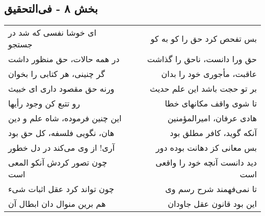 \begin{center}
\section*{بخش ۸ - فی‌التحقیق}
\label{sec:008}
\begin{longtable}{l p{0.5cm} r}
ای خوشا نفسی که شد در جستجو
&&
بس تفحص کرد حق را کو به کو
\\
در همه حالات، حق منظور داشت
&&
حق ورا دانست، ناحق را گذاشت
\\
گر چنینی، هر کتابی را بخوان
&&
عاقبت، مأجوری خود را بدان
\\
ورنه حق مقصود داری ای خبیث
&&
بر تو حجت باشد این علم حدیث
\\
رو تتبع کن وجود رأیها
&&
تا شوی واقف مکانهای خطا
\\
این چنین فرموده، شاه علم و دین
&&
هادی عرفان، امیرالمؤمنین
\\
هان، نگویی فلسفه، کل حق بود
&&
آنکه گوید، کافر مطلق بود
\\
آری! از وی می‌کند در دل خطور
&&
بس معانی کز دهانت بوده دور
\\
چون تصور کردش آنکو المعی است
&&
دید دانست آنچه خود را واقعی است
\\
چون تواند کرد عقل اثبات شیء
&&
تا نمی‌فهمند شرح رسم وی
\\
هم برین منوال دان ابطال آن
&&
این بود قانون عقل جاودان
\\
\end{longtable}
\end{center}
